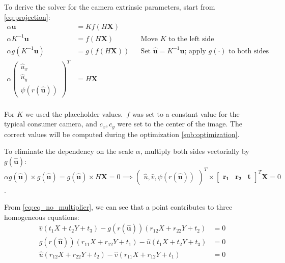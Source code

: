 To derive the solver for the camera extrinsic parameters, start from
\cref{eq:projection}:
\begin{align}
	\alpha \mathbf{u}                                  & = K f(H\mathbf{X})                  \\
	\alpha K^{-1} \mathbf{u}                           & = f(H\mathbf{X})    &  &
	\text{Move \(K\) to the left side}                                                       \\
	\alpha g( K^{-1}\mathbf{u})                        & = g(f(H\mathbf{X})) &  &
	\text{Set \(\mathbf{\widehat{u}} = K^{-1}\mathbf{u}\); apply \(g(\cdot)\) to both sides} \\
	\alpha \begin{pmatrix}
		       \widehat{u}_x \\ \widehat{u}_y \\ \psi(r(\mathbf{\widehat{u}}))
	       \end{pmatrix}^{T} & = H\mathbf{X}                                 \\
\end{align}

For \(K\) we used the placeholder values.\ \(f\) was set to a constant value for
the typical consumer camera, and \(c_x, c_y\) were set to the center of the
image.
The correct values will be computed during the optimization \cref{sub:optimization}.

To eliminate the dependency on the scale \(\alpha\), multiply both sides
vectorially by \(g(\mathbf{\widehat{u}})\):
\begin{equation}
	\alpha g(\mathbf{\widehat{u}}) \times g(\mathbf{\widehat{u}})
	= g(\mathbf{\widehat{u}}) \times H\mathbf{X}
	= 0 \implies
	\begin{pmatrix}
		\widehat{u}, \widehat{v}, \psi(r(\mathbf{\widehat{u}}))
	\end{pmatrix}^{T} \times \begin{bmatrix}
		\mathbf{r_1} & \mathbf{r_2} & \mathbf{t}
	\end{bmatrix}^{T} \mathbf{X} = 0
	\label{eq:eq_no_multiplier}
\end{equation}.

From \cref{eq:eq_no_multiplier}, we can see that a point contributes to three
homogeneous equations:
\begin{align}
	\widehat{v} (t_1X + t_2 Y + t_3) -
	g(r(\mathbf{\widehat{u}})) (r_{12}X + r_{22}Y + t_2 ) & = 0
	\label{eq:scaramuzza_system_1}                              \\
	g(r(\mathbf{\widehat{u}})) (r_{11}X + r_{12}Y + t_1) -
	\widehat{u} (t_1X + t_2 Y + t_3)                      & = 0
	\label{eq:scaramuzza_system_2}                              \\
	\widehat{u} (r_{12}X + r_{22}Y + t_2 ) -
	\widehat{v} (r_{11}X + r_{12}Y + t_1)                 & = 0
	\label{eq:scaramuzza_system_3}
\end{align}

